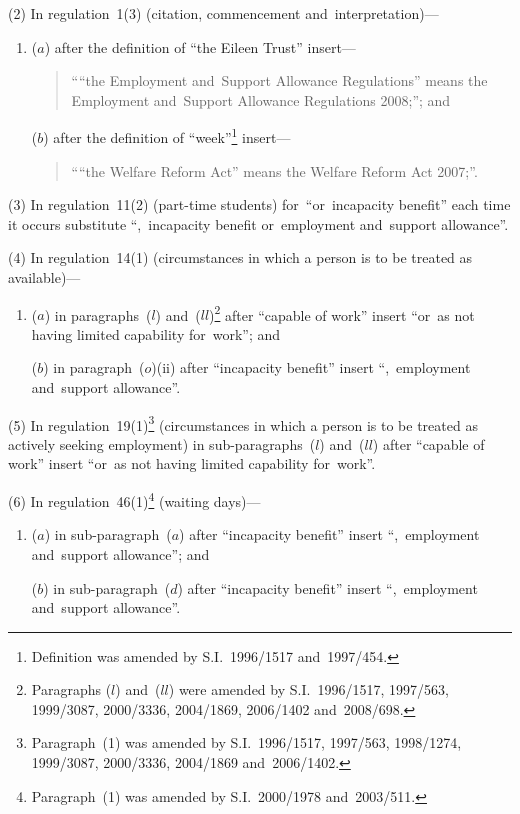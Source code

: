 \documentclass[12pt,a4paper]{article}
\begin{document}
(2) In regulation~1(3) (citation, commencement and~interpretation)—
\begin{enumerate}\item[]
($a$) after the definition of “the Eileen Trust” insert—
\begin{quotation}
““the Employment and~Support Allowance Regulations” means the Employment and~Support Allowance Regulations 2008;”; and
\end{quotation}

($b$) after the definition of “week”\footnote{Definition was amended by S.I.~1996/1517 and~1997/454.} insert—
\begin{quotation}
““the Welfare Reform Act” means the Welfare Reform Act 2007;”.
\end{quotation}
\end{enumerate}

(3) In regulation~11(2) (part-time students) for~“or~incapacity benefit” each time it occurs substitute “,~incapacity benefit or~employment and~support allowance”.

(4) In regulation~14(1) (circumstances in which a person is to be treated as available)—
\begin{enumerate}\item[]
($a$) in paragraphs~($l$)  and~($ll$)\footnote{Paragraphs ($l$)  and~($ll$)  were amended by S.I.~1996/1517, 1997/563, 1999/3087, 2000/3336, 2004/1869, 2006/1402 and~2008/698.} after “capable of work” insert “or~as not having limited capability for~work”; and

($b$) in paragraph~($o$)(ii)  after “incapacity benefit” insert “,~employment and~support allowance”.
\end{enumerate}

(5) In regulation~19(1)\footnote{Paragraph~(1) was amended by S.I.~1996/1517, 1997/563, 1998/1274, 1999/3087, 2000/3336, 2004/1869 and~2006/1402.} (circumstances in which a person is to be treated as actively seeking employment) in sub-paragraphs~($l$)  and~($ll$)  after “capable of work” insert “or~as not having limited capability for~work”.

(6) In regulation~46(1)\footnote{Paragraph~(1) was amended by S.I.~2000/1978 and~2003/511.} (waiting days)—
\begin{enumerate}\item[]
($a$) in sub-paragraph~($a$)  after “incapacity benefit” insert “,~employment and~support allowance”; and

($b$) in sub-paragraph~($d$)  after “incapacity benefit” insert “,~employment and~support allowance”.
\end{enumerate}
\end{document}
